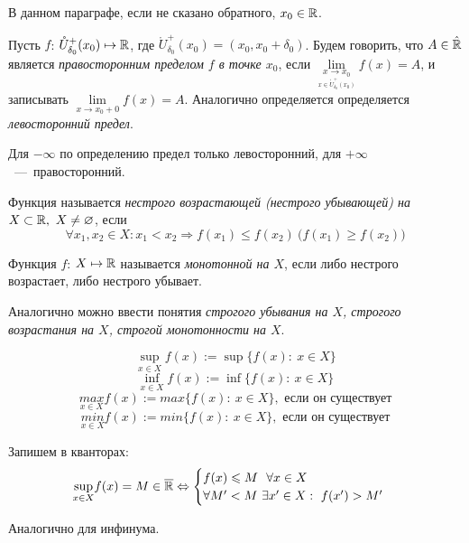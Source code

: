 В данном параграфе, если не сказано обратного, $x_{0} \in \mathbb{R}$.

\begin{definition}
    Пусть $f$: $\mathring{U}^{+}_{\delta_{0}} (x_{0})  \mapsto \mathbb{R}$, где $\mathring{U}^{+}_{\delta_{0}} (x_{0}) = (x_{0}, x_{0} + \delta_{0})$.
    Будем говорить, что $A\in \Hat{\mathbb{R}}$ является \textit{правосторонним пределом $f$ в точке $x_{0}$}, если $ \lim\limits_{\underset{x \in \mathring{U}^+_{\delta_0} (x_0) }{x\to x_0}} f (x) = A$, и записывать $\lim\limits_{x \to x_{0} +0} f(x) = A$. Аналогично определяется определяется \textit{левосторонний предел}.
\end{definition}
\begin{note}
    Для $-\infty$ по определению предел только левосторонний, для $+\infty$~---~правосторонний.
\end{note}
\begin{definition}
    Функция называется \textit{нестрого возрастающей (нестрого убывающей) на $X \subset \mathbb{R},\  X \neq \varnothing$}, если 
    $$\forall x_{1}, x_{2} \in X: x_{1} < x_{2} \Rightarrow f(x_{1}) \leq f(x_{2}) \ \bigg(f(x_{1}) \geq f(x_{2}) \bigg)$$
\end{definition}

\begin{definition}
    Функция $f$: $X \mapsto \mathbb{R}$ называется \textit{монотонной на $X$}, если либо нестрого возрастает, либо нестрого убывает.    
\end{definition}

\begin{definition}
    Аналогично можно ввести понятия \textit{строгого убывания на $X$, строгого возрастания на $X$, строгой монотонности на $X$}.
\end{definition}

\begin{definition}
    $$\underset{x \in X}{\sup} f(x) := \sup\{ f(x): \ x \in X\}$$
    $$\underset{x \in X}{\inf} f(x) := \inf \{ f(x): \ x \in X\}$$
    $$\underset{x \in X}{max} f(x) := max \{ f(x): \ x \in X\}, \text{ если он существует}$$
    $$\underset{x \in X}{min} f(x) := min \{ f(x):\  x \in X\}, \text{ если он существует}$$

   Запишем в кванторах: 
    $$\underset{x \in X}{\sup} f(x) = M \in \overline{\mathbb{R}} \Leftrightarrow 
    \begin{cases}
        f(x) \leqslant M \ \ \forall x\in X\\
        \forall M' < M \ \exists x' \in X: \ f(x') > M'
    \end{cases}$$

    Аналогично для инфинума.

\end{definition}

